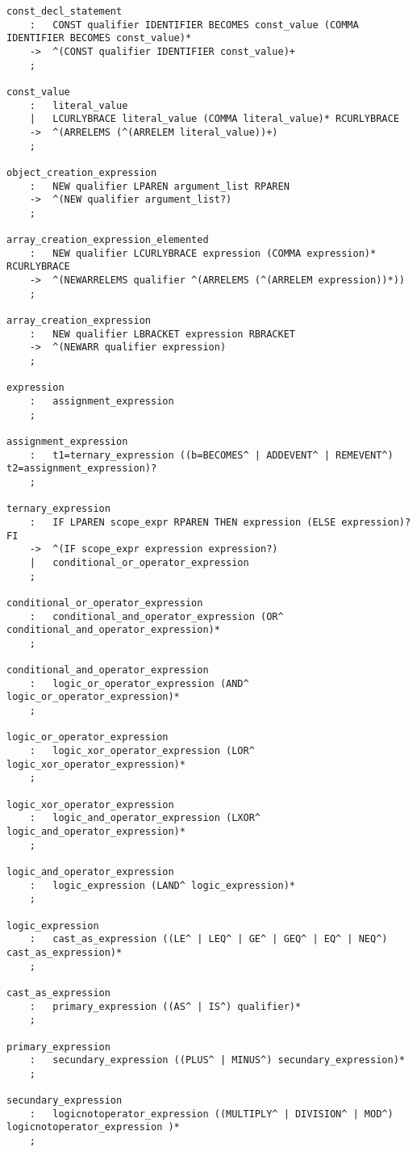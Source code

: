 \begin{lstlisting}
const_decl_statement
	:	CONST qualifier IDENTIFIER BECOMES const_value (COMMA IDENTIFIER BECOMES const_value)*
	->	^(CONST qualifier IDENTIFIER const_value)+
	;
	
const_value
	:	literal_value
	|	LCURLYBRACE literal_value (COMMA literal_value)* RCURLYBRACE
	->	^(ARRELEMS (^(ARRELEM literal_value))+)
	;
	
object_creation_expression
	:	NEW qualifier LPAREN argument_list RPAREN
	->	^(NEW qualifier argument_list?)
	;
	
array_creation_expression_elemented
	:	NEW qualifier LCURLYBRACE expression (COMMA expression)* RCURLYBRACE
	->	^(NEWARRELEMS qualifier ^(ARRELEMS (^(ARRELEM expression))*))
	;
	
array_creation_expression
	:	NEW qualifier LBRACKET expression RBRACKET
	->	^(NEWARR qualifier expression)
	;

expression
	:	assignment_expression
	;

assignment_expression
	:	t1=ternary_expression ((b=BECOMES^ | ADDEVENT^ | REMEVENT^) t2=assignment_expression)?
	;

ternary_expression
	:	IF LPAREN scope_expr RPAREN THEN expression (ELSE expression)? FI
	->	^(IF scope_expr expression expression?)
	|	conditional_or_operator_expression
	;

conditional_or_operator_expression
	:	conditional_and_operator_expression (OR^ conditional_and_operator_expression)*
	;

conditional_and_operator_expression
	:	logic_or_operator_expression (AND^ logic_or_operator_expression)*
	;

logic_or_operator_expression
	:	logic_xor_operator_expression (LOR^ logic_xor_operator_expression)*
	;

logic_xor_operator_expression
	:	logic_and_operator_expression (LXOR^ logic_and_operator_expression)*
	;

logic_and_operator_expression
	:	logic_expression (LAND^ logic_expression)*
	;

logic_expression
	:	cast_as_expression ((LE^ | LEQ^ | GE^ | GEQ^ | EQ^ | NEQ^) cast_as_expression)*
	;

cast_as_expression
	:	primary_expression ((AS^ | IS^) qualifier)*
	;
	
primary_expression
	:	secundary_expression ((PLUS^ | MINUS^) secundary_expression)*
	;
	
secundary_expression
	:	logicnotoperator_expression ((MULTIPLY^ | DIVISION^ | MOD^) logicnotoperator_expression )*
	;


\end{lstlisting}
